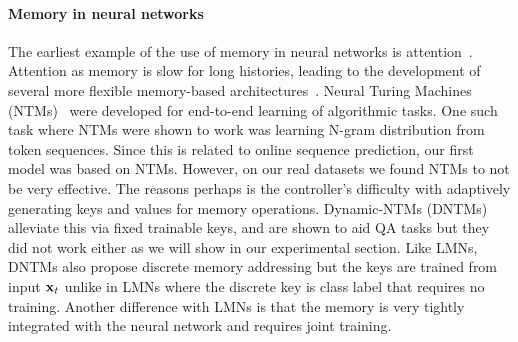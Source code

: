 \documentclass[letterpaper]{article} %
\newcommand{\vek}[1]{{\bf {#1}}}
\newcommand{\vx}{{\vek{x}}}
\begin{document}
\paragraph{Memory in neural networks}
The earliest example of the use of memory in neural networks is attention~.
Attention as memory is slow for long histories, leading to the development of several more flexible memory-based architectures~\cite{Weston16}.
Neural Turing Machines (NTMs)~\cite{GravesNTM} were developed for end-to-end learning of algorithmic tasks. One such task where NTMs were shown to work was learning N-gram distribution from token sequences. Since this is related to online sequence prediction, our first model was based on NTMs.  However, on our real datasets we found NTMs to not be very effective. The reasons perhaps is the controller's difficulty with adaptively generating keys and values for memory operations.  Dynamic-NTMs (DNTMs)~\cite{GulcehreCCB16} alleviate this via fixed trainable keys, and are shown to aid QA tasks but they did not work either as we will show in our experimental section.
Like LMNs, DNTMs also propose discrete memory addressing but the keys are trained from input $\vx_t$ unlike in LMNs where the discrete key is class label that requires no training.
Another difference with LMNs is that the memory is very tightly integrated with the neural network and requires joint training.
\end{document}
